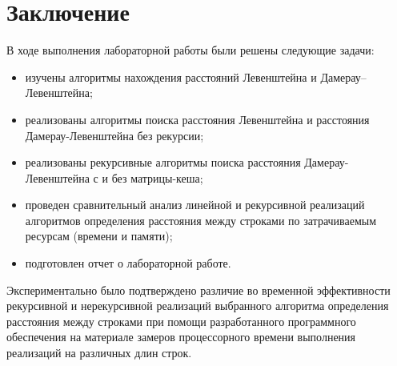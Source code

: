 \chapter*{Заключение}

В ходе выполнения лабораторной работы были решены следующие задачи:

\begin{itemize}
    \item изучены алгоритмы нахождения расстояний Левенштейна и Дамерау--Левенштейна;
	\item реализованы алгоритмы поиска расстояния Левенштейна и расстояния Дамерау-Левенштейна без рекурсии;
	\item реализованы рекурсивные алгоритмы поиска расстояния Дамерау-Левенштейна с и без матрицы-кеша;
	\item проведен сравнительный анализ линейной и рекурсивной реализаций алгоритмов определения расстояния между строками по затрачиваемым ресурсам (времени и памяти);
	\item подготовлен отчет о лабораторной работе.
\end{itemize}

Экспериментально было подтверждено различие во временной эффективности рекурсивной и нерекурсивной реализаций выбранного алгоритма определения расстояния между строками при помощи разработанного программного обеспечения на материале замеров процессорного времени выполнения реализаций на различных длин строк.
